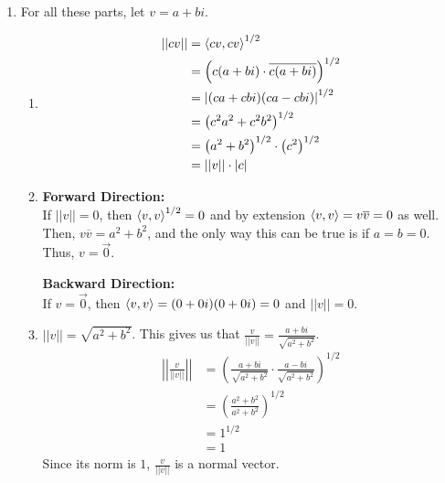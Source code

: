 \documentclass[12pt]{article}
\begin{document}
\begin{enumerate}
      \item For all these parts, let $v=a+bi$.
            \begin{enumerate}
                  \item \begin{align*}
                              ||cv|| & = \braket{cv, cv}^{1/2}                                   \\
                                     & = \left(c(a+bi) \cdot \overline{c(a+bi)}\right)^{1/2}     \\
                                     & = \left|(ca+cbi)(ca-cbi)\right|^{1/2}                     \\
                                     & = \left(c^2a^2+c^2b^2\right)^{1/2}                        \\
                                     & = \left(a^2+b^2\right)^{1/2} \cdot \left(c^2\right)^{1/2} \\
                                     & = ||v|| \cdot |c|
                        \end{align*}
                  \item \textbf{Forward Direction:} \\
                        If $||v||=0$, then $\braket{v, v}^{1/2}=0$ and by extension $\braket{v, v}=v\overline{v}=0$ as well.
                        Then, $v\overline{v}=a^2+b^2$, and the only way this can be true is if $a=b=0$.
                        Thus, $v=\vec{0}$.

                        \textbf{Backward Direction:} \\
                        If $v=\vec{0}$, then $\braket{v, v}=(0+0i)(0+0i)=0$ and $||v||=0$.
                  \item $||v||=\sqrt{a^2+b^2}$.
                        This gives us that $\frac{v}{||v||}=\frac{a+bi}{\sqrt{a^2+b^2}}$.
                        \begin{align*}
                              \left|\left|\frac{v}{||v||}\right|\right| & = \left(\frac{a+bi}{\sqrt{a^2+b^2}} \cdot \frac{a-bi}{\sqrt{a^2+b^2}}\right)^{1/2} \\
                                                                        & = \left(\frac{a^2+b^2}{a^2+b^2}\right)^{1/2}                                       \\
                                                                        & = 1^{1/2}                                                                          \\
                                                                        & = 1
                        \end{align*}
                        Since its norm is $1$, $\frac{v}{||v||}$ is a normal vector.
            \end{enumerate}


\end{enumerate}
\end{document}
